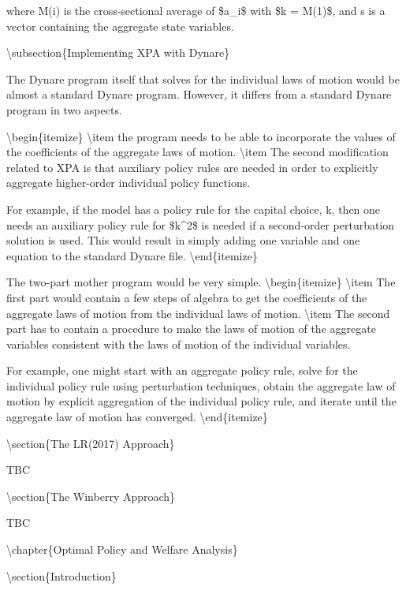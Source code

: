 \documentclass[10pt,math=newtx,citestyle=gb7714-2015,bibstyle=gb7714-2015]{elegantbook}
\begin{document}
	where M(i) is the cross-sectional average of \$a\_i\$ with \$k = M(1)\$, and s is a vector containing the aggregate state variables.
	
	
	
	
	\textbackslash{}subsection\{Implementing XPA with Dynare\}
	
	The Dynare program itself that solves for the individual laws of motion would be almost a standard Dynare program. However, it differs from a standard Dynare program in two aspects.
	
	\textbackslash{}begin\{itemize\}
	\textbackslash{}item the program needs to be able to incorporate the values of the coefficients of the aggregate laws of motion.
	\textbackslash{}item The second modification related to XPA is that auxiliary policy rules are needed in order to explicitly aggregate higher-order individual policy functions.
	
	For example, if the model has a policy rule for the capital choice, k, then one needs an auxiliary policy rule for \$k\^{}2\$ is needed if a second-order perturbation solution is used. This would result in simply adding one variable and one equation to the standard Dynare file.
	\textbackslash{}end\{itemize\}
	
	The two-part mother program would be very simple.
	\textbackslash{}begin\{itemize\}
	\textbackslash{}item The first part would contain a few steps of algebra to get the coefficients of the aggregate laws of motion from the individual laws of motion.
	\textbackslash{}item The second part has to contain a procedure to make the laws of motion of the aggregate variables consistent with the laws of motion of the individual variables.
	
	For example, one might start with an aggregate policy rule, solve for the individual policy rule using perturbation techniques, obtain the aggregate law of motion by explicit aggregation of the individual policy rule, and iterate until the aggregate law of motion has converged.
	\textbackslash{}end\{itemize\}
	
	\textbackslash{}section\{The LR(2017) Approach\}
	
	TBC
	
	\textbackslash{}section\{The Winberry Approach\}
	
	TBC
	
	\textbackslash{}chapter\{Optimal Policy and Welfare Analysis\}
	
	\textbackslash{}section\{Introduction\}
	
\end{document}
